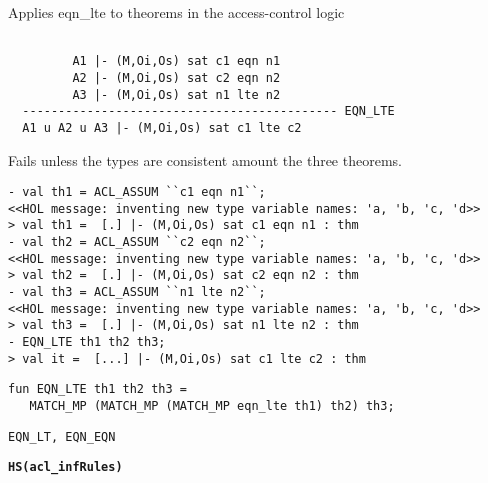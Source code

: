 \SYNOPSIS
Applies eqn\_lte to theorems in the access-control logic

\DESCRIBE
\begin{verbatim}

         A1 |- (M,Oi,Os) sat c1 eqn n1
         A2 |- (M,Oi,Os) sat c2 eqn n2  
         A3 |- (M,Oi,Os) sat n1 lte n2
  -------------------------------------------- EQN_LTE
  A1 u A2 u A3 |- (M,Oi,Os) sat c1 lte c2
\end{verbatim}
\FAILURE

Fails unless the types are consistent amount the three theorems.

\EXAMPLE
\begin{holboxed}
\begin{verbatim}
- val th1 = ACL_ASSUM ``c1 eqn n1``;
<<HOL message: inventing new type variable names: 'a, 'b, 'c, 'd>>
> val th1 =  [.] |- (M,Oi,Os) sat c1 eqn n1 : thm
- val th2 = ACL_ASSUM ``c2 eqn n2``;
<<HOL message: inventing new type variable names: 'a, 'b, 'c, 'd>>
> val th2 =  [.] |- (M,Oi,Os) sat c2 eqn n2 : thm
- val th3 = ACL_ASSUM ``n1 lte n2``;
<<HOL message: inventing new type variable names: 'a, 'b, 'c, 'd>>
> val th3 =  [.] |- (M,Oi,Os) sat n1 lte n2 : thm
- EQN_LTE th1 th2 th3;
> val it =  [...] |- (M,Oi,Os) sat c1 lte c2 : thm
\end{verbatim}
\end{holboxed}
\IMPLEMENTATION
\begin{holboxed}
\begin{verbatim}
fun EQN_LTE th1 th2 th3 =
   MATCH_MP (MATCH_MP (MATCH_MP eqn_lte th1) th2) th3;
\end{verbatim}
\end{holboxed}
\SEEALSO

\texttt{EQN\_LT, EQN\_EQN}
\ENDDOC

\begin{holboxed}
  \begin{Large}
    \textbf{\texttt{HS}}\hfill{}\textbf{\texttt{(acl\_infRules)}}
  \end{Large}
\end{holboxed}

